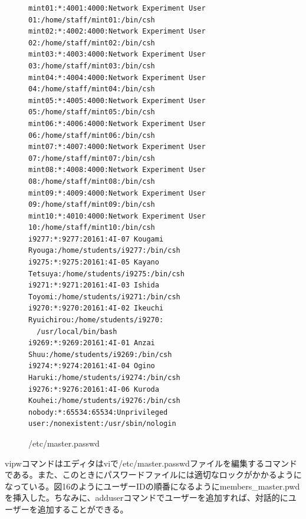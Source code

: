 \documentclass[12pt]{jreport}
\begin{document}
                \begin{figure}[H]
                    \begin{center}
                        \begin{screen}
                            \begin{verbatim}
mint01:*:4001:4000:Network Experiment User 01:/home/staff/mint01:/bin/csh
mint02:*:4002:4000:Network Experiment User 02:/home/staff/mint02:/bin/csh
mint03:*:4003:4000:Network Experiment User 03:/home/staff/mint03:/bin/csh
mint04:*:4004:4000:Network Experiment User 04:/home/staff/mint04:/bin/csh
mint05:*:4005:4000:Network Experiment User 05:/home/staff/mint05:/bin/csh
mint06:*:4006:4000:Network Experiment User 06:/home/staff/mint06:/bin/csh
mint07:*:4007:4000:Network Experiment User 07:/home/staff/mint07:/bin/csh
mint08:*:4008:4000:Network Experiment User 08:/home/staff/mint08:/bin/csh
mint09:*:4009:4000:Network Experiment User 09:/home/staff/mint09:/bin/csh
mint10:*:4010:4000:Network Experiment User 10:/home/staff/mint10:/bin/csh
i9277:*:9277:20161:4I-07 Kougami Ryouga:/home/students/i9277:/bin/csh
i9275:*:9275:20161:4I-05 Kayano Tetsuya:/home/students/i9275:/bin/csh
i9271:*:9271:20161:4I-03 Ishida Toyomi:/home/students/i9271:/bin/csh
i9270:*:9270:20161:4I-02 Ikeuchi Ryuichirou:/home/students/i9270:
  /usr/local/bin/bash
i9269:*:9269:20161:4I-01 Anzai Shuu:/home/students/i9269:/bin/csh
i9274:*:9274:20161:4I-04 Ogino Haruki:/home/students/i9274:/bin/csh
i9276:*:9276:20161:4I-06 Kuroda Kouhei:/home/students/i9276:/bin/csh
nobody:*:65534:65534:Unprivileged user:/nonexistent:/usr/sbin/nologin
                            \end{verbatim}
                        \end{screen}
                        \caption{/etc/master.passwd}
                        \label{16}
                    \end{center}
                \end{figure}
                vipwコマンドはエディタはviで/etc/master.passwdファイルを編集するコマンドである。また、このときにパスワードファイルには適切なロックがかかるようになっている。図16のようにユーザーIDの順番になるようにmembers\_master.pwdを挿入した。ちなみに、adduserコマンドでユーザーを追加すれば、対話的にユーザーを追加することができる。
\end{document}
